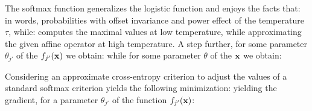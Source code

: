 \documentclass{article}\usepackage[width=17cm,height=22cm]{geometry}\usepackage[english]{babel} \usepackage[utf8]{inputenc}\usepackage{fancyvrb} \usepackage{authblk} \usepackage{amsmath}\usepackage{amsfonts} \usepackage{hyperref}\usepackage{outlines} \usepackage{graphicx} \usepackage{color}\DeclareGraphicsExtensions{.pdf,.png,.jpg}\definecolor{vthierry}{RGB}{80,0,120}\newcommand{\vthierry}[1]{{\color{vthierry}{#1}}}\definecolor{thalita}{RGB}{51, 153, 255}\newcommand{\thalita}[1]{{\color{thalita}{#1}}}
\begin{document}
The softmax function generalizes the logistic function and enjoys the facts that:
in words, probabilities with offset invariance and power effect of the temperature $\tau$, while:
computes the maximal values at low temperature, while approximating the given affine operator at high temperature. 
A step further, for some parameter $\theta_{j'}$ of the $f_{j'}({\bf x})$ we obtain:
while for some parameter $\theta$ of the ${\bf x}$ we obtain:

Considering an approximate cross-entropy criterion to adjust the values of a standard softmax criterion yields the following minimization:
yielding the gradient, for a parameter $\theta_{j'}$ of the function $f_{j'}({\bf x})$:
\end{document}
